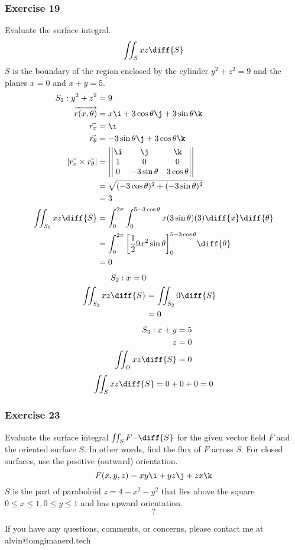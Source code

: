 \documentclass{math}
\begin{document}
\subsubsection*{Exercise 19}
Evaluate the surface integral.
\[ \iint_{S}xz\diff{S} \]
\( S \) is the boundary of the region enclosed by the cylinder \( y^2+z^2 = 9 \)
and the planes \( x = 0 \) and \( x+y = 5 \).
\begin{align*}
  S_1: y^2+z^2 &= 9 \\
  \overrightarrow{r(x,\theta)} &= x\i+3\cos\theta\j+3\sin\theta\k \\
  \vec{r_x} &= \i \\
  \vec{r_\theta} &= -3\sin\theta\j+3\cos\theta\k \\
  |\vec{r_x}\times\vec{r_\theta}| &= \left|\begin{vmatrix}
    \i & \j & \k \\
    1 & 0 & 0 \\
    0 & -3\sin\theta & 3\cos\theta
  \end{vmatrix}\right| \\
  &= \sqrt{(-3\cos\theta)^2+(-3\sin\theta)^2} \\
  &= 3 \\
  \iint_{S_1}xz\diff{S} &= \int_{0}^{2\pi}\int_{0}^{5-3\cos\theta}
    x(3\sin\theta)(3)\diff{x}\diff{\theta} \\
  &= \int_{0}^{2\pi}\bigg[\frac{1}{2}9x^2\sin\theta\bigg]_{0}^{5-3\cos\theta}
    \diff{\theta} \\
  &= 0
\end{align*}
\begin{align*}
  S_2: x = 0 \\
  \iint_{S_2}xz\diff{S} &= \iint_{S_2}0\diff{S} \\
  &= 0
\end{align*}
\begin{align*}
  S_3: x+y &= 5 \\
  z &= 0 \\
  \iint_{D}xz\diff{S} &= 0
\end{align*}
\[ \iint_{S}xz\diff{S} = 0+0+0 = 0 \]

\subsubsection*{Exercise 23}
Evaluate the surface integral \( \iint_{S}F\cdot\diff{S} \) for the given vector
field \( F \) and the oriented surface \( S \). In other words, find the flux of
\( F \) across \( S \). For closed surfaces, use the positive (outward)
orientation.
\[ F(x,y,z) = xy\i+yz\j+zx\k \]
\( S \) is the part of paraboloid \( z = 4-x^2-y^2 \) that lies above the square
\( 0\le x\le1,0\le y\le1 \) and has upward orientation.
\[ ? \]

\begin{center}
  If you have any questions, comments, or concerns, please contact me at
  alvin@omgimanerd.tech
\end{center}
\end{document}
